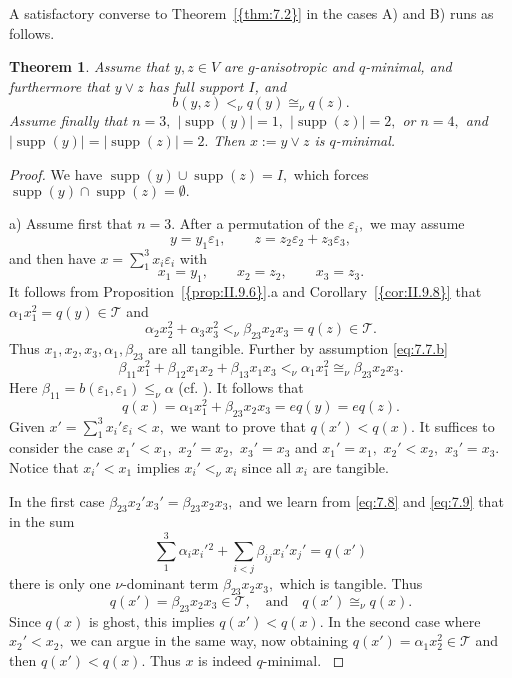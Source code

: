 \documentclass [12pt,a4paper,reqno]{amsart}
\newtheorem{thm}{Theorem} [section]
\begin{document}
A satisfactory converse to {Theorem~\ref{{thm:7.2}}} in the cases A) and B)
runs as follows.

\begin{thm}\label{thm:7.3}
Assume that $y,z\in V$ are $g$-anisotropic and $q$-minimal,
and furthermore  that $y\vee z$ has full support $I$, and
\begin{equation}\label{eq:7.7.b}
b(y,z)<_\nu q(y)\cong_\nu q(z).
\end{equation}
Assume finally that $n=3,$ $|{\operatorname{supp}} (y)|=1,$ $|{\operatorname{supp}} (z)|=2,$ or $n=4,$ and
$|{\operatorname{supp}} (y)|=|{\operatorname{supp}} (z)|=2.$ Then $x:=y\vee z$ is $q$-minimal.
\end{thm}

\begin{proof}
We have ${\operatorname{supp}} (y)\cup{\operatorname{supp}} (z)=I,$ which forces ${\operatorname{supp}}(y)\cap{\operatorname{supp}}
(z)=\emptyset.$
{\vskip 1.5mm \noindent}

a) Assume first that $n=3.$ After a permutation of the
${\varepsilon}_i,$ we may assume
$$y=y_1{\varepsilon}_1,\qquad z=z_2{\varepsilon}_2+z_3{\varepsilon}_3,$$
and then have $x=\sum\limits_1^3x_i{\varepsilon}_i$ with
$$x_1=y_1,\qquad x_2=z_2,\qquad x_3=z_3.$$
It follows from {Proposition~\ref{{prop:II.9.6}}}.a  and
{Corollary~\ref{{cor:II.9.8}}} that ${\alpha}_1x_1^2=q(y)\in{\mathcal T}$ and
\begin{equation}\label{eq:7.8}
{\alpha}_2x_2^2+{\alpha}_3x_3^2<_\nu{\beta}_{23}x_2x_3=q(z)\in{\mathcal T}.\end{equation} Thus $x_1,x_2,x_3,{\alpha}_1,{\beta}_{23}$ are all
tangible. Further by assumption \eqref{eq:7.7.b}
\begin{equation}\label{eq:7.9}
{\beta}_{11}x_1^2+{\beta}_{12}x_1x_2+{\beta}_{13}x_1x_3<_\nu{\alpha}_1x_1^2\cong_\nu{\beta}_{23}x_2x_3.
\end{equation}
Here ${\beta}_{11}=b({\varepsilon}_1,{\varepsilon}_1)\le_\nu{\alpha}$ (cf.
\cite[Ineq. (1.9)]{QF1}). It follows that
$$q(x)={\alpha}_1x_1^2+{\beta}_{23}x_2x_3=eq(y)=eq(z).$$
Given $x'=\sum\limits_1^3x_i'{\varepsilon}_i< x,$ we want to prove
that $q(x')<q(x).$ It suffices to consider the case $x_1'<x_1,$
$x_2'=x_2,$ $x_3'=x_3$ and $x_1'=x_1,$ $x_2'<x_2,$ $x_3'=x_3.$
Notice that $x_i'<x_1$ implies $x_i'<_\nu x_i$ since all $x_i$ are
tangible.

In the first case ${\beta}_{23}x_2'x_3'={\beta}_{23}x_2x_3,$ and we
learn from \eqref{eq:7.8} and \eqref{eq:7.9} that in the sum
$$\sum_1^3{\alpha}_ix_i'{}^{2}+\sum_{i<j}{\beta}_{ij}x_i'x_j'=q(x')$$
there is only one $\nu$-dominant term ${\beta}_{23}x_2x_3,$ which is
tangible. Thus
$$q(x')={\beta}_{23}x_2x_3\in {\mathcal T},\quad\text{and}\quad
q(x')\cong_\nu q(x).$$ Since $q(x)$ is ghost, this implies
$q(x') <  q(x).$ In the second case where $x_2'<x_2,$ we can
argue in the same way, now obtaining
$q(x')={\alpha}_1x_2^2\in{\mathcal T}$ and then $q(x')<q(x).$ Thus $x$
is indeed $q$-minimal.
{\vskip 1.5mm \noindent}


\end{proof}
\end{document}
